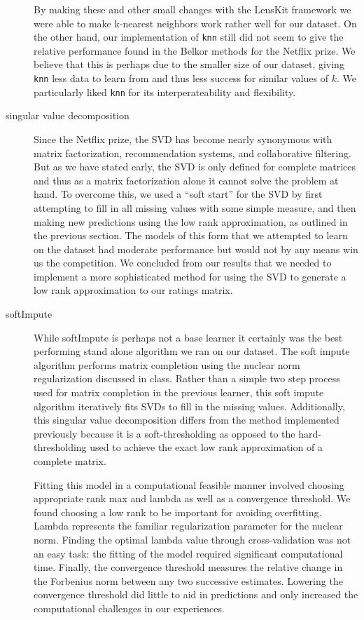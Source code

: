 \documentclass[oneside]{article}
\begin{document}
\begin{description}
By making these and other small changes with the LensKit framework we were able to make k-nearest neighbors work rather well for our dataset. On the other hand, our implementation of \verb|knn| still did not seem to give the relative performance found in the Belkor methods for the Netflix prize. We believe that this is perhaps due to the smaller size of our dataset, giving \verb|knn| less data to learn from and thus less success for similar values of $k$. We particularly liked \verb|knn| for its interperateability and flexibility. 
    \item[singular value decomposition] Since the Netflix prize, the SVD has become nearly synonymous with matrix factorization, recommendation systems, and collaborative filtering. But as we have stated early, the SVD is only defined for complete matrices and thus as a matrix factorization alone it cannot solve the problem at hand. To overcome this, we used a ``soft start'' for the SVD by first attempting to fill in all missing values with some simple measure, and then making new predictions using the low rank approximation, as outlined in the previous section. The models of this form that we attempted to learn on the dataset had moderate performance but would not by any means win us the competition. We concluded from our results that we needed to implement a more sophisticated method for using the SVD to generate a low rank approximation to our ratings matrix.
    \item[softImpute] While softImpute is perhaps not a base learner it certainly was the best performing stand alone algorithm we ran on our dataset. The soft impute algorithm performs matrix completion using the nuclear norm regularization discussed in class. Rather than a simple two step process used for matrix completion in the previous learner, this soft impute algorithm iteratively fits SVDs to fill in the missing values. Additionally, this singular value decomposition differs from the method implemented previously because it is a soft-thresholding as opposed to the hard-thresholding used to achieve the exact low rank approximation of a complete matrix. 

Fitting this model in a computational feasible manner involved choosing appropriate rank max and lambda as well as a convergence threshold. We found choosing a low rank to be important for avoiding overfitting. Lambda represents the familiar regularization parameter for the nuclear norm. Finding the optimal lambda value through cross-validation was not an easy task: the fitting of the model required significant computational time. Finally, the convergence threshold measures the relative change in the Forbenius norm between any two successive estimates. Lowering the convergence threshold did little to aid in predictions and only increased the computational challenges in our experiences. 


\end{description}
\end{document}
